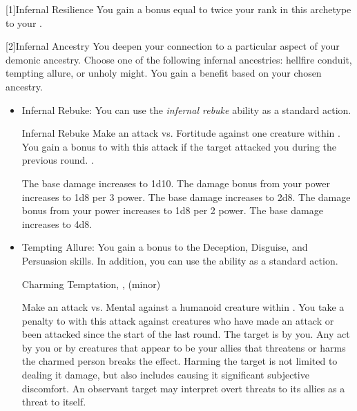             [1]{Infernal Resilience} You gain a bonus equal to twice your rank in this archetype to your .

            [2]{Infernal Ancestry} You deepen your connection to a particular aspect of your demonic ancestry.
            Choose one of the following infernal ancestries: hellfire conduit, tempting allure, or unholy might.
            You gain a benefit based on your chosen ancestry.
            \begin{itemize}
                \item Infernal Rebuke: You can use the \textit{infernal rebuke} ability as a standard action.
                    \begin{magicalactiveability}{Infernal Rebuke}
                        \rankline
                        Make an attack vs. Fortitude against one creature within \shortrange.
                        You gain a  bonus to  with this attack if the target attacked you during the previous round.
                        \hit {}.

                        \rankline
                         The base damage increases to 1d10.
                         The damage bonus from your power increases to 1d8 per 3 power.
                         The base damage increases to 2d8.
                         The damage bonus from your power increases to 1d8 per 2 power.
                         The base damage increases to 4d8.
                    \end{magicalactiveability}
                \item Tempting Allure: You gain a  bonus to the Deception, Disguise, and Persuasion skills.
                    In addition, you can use the  ability as a standard action.
                    \begin{magicalsustainability}{Charming Temptation}{, ,  (minor)}
                        \rankline
                        \noindent

                        Make an attack vs. Mental against a humanoid creature within \medrange.
                        You take a  penalty to  with this attack against creatures who have made an attack or been attacked since the start of the last round.
                        \vspace{0.25em}
                        \hit The target is \charmed by you.
                        Any act by you or by creatures that appear to be your allies that threatens or harms the charmed person breaks the effect.
                        Harming the target is not limited to dealing it damage, but also includes causing it significant subjective discomfort.
                        An observant target may interpret overt threats to its allies as a threat to itself.


\end{magicalsustainability}
\end{itemize}
